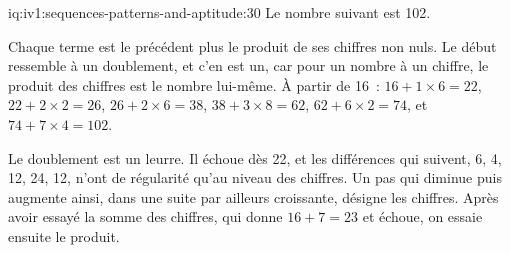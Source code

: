 \begin{solution}{iq:iv1:sequences-patterns-and-aptitude:30}
Le nombre suivant est 102.

Chaque terme est le précédent plus le produit de ses chiffres non nuls. Le début ressemble à un doublement, et c'en est un, car pour un nombre à un chiffre, le produit des chiffres est le nombre lui-même. À partir de 16~: $16 + 1 \times 6 = 22$, $22 + 2 \times 2 = 26$, $26 + 2 \times 6 = 38$, $38 + 3 \times 8 = 62$, $62 + 6 \times 2 = 74$, et $74 + 7 \times 4 = 102$.

Le doublement est un leurre. Il échoue dès 22, et les différences qui suivent, 6, 4, 12, 24, 12, n'ont de régularité qu'au niveau des chiffres. Un pas qui diminue puis augmente ainsi, dans une suite par ailleurs croissante, désigne les chiffres. Après avoir essayé la somme des chiffres, qui donne $16 + 7 = 23$ et échoue, on essaie ensuite le produit.

\end{solution}
